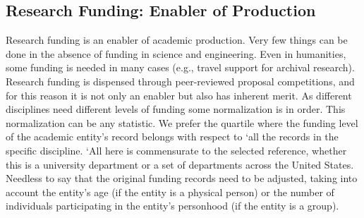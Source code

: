 \subsection {Research Funding: Enabler of Production}
Research funding is an enabler of academic production. Very few things can be done in the absence of funding in science and engineering. Even in humanities, some funding is needed in many cases (e.g., travel support for archival research).  Research funding is dispensed through peer-reviewed proposal competitions, and for this reason it is not only an enabler but also has inherent merit. As different disciplines need different levels of funding some normalization is in order. This normalization can be any statistic. We prefer the quartile where the funding level of the academic entity's record belongs with respect to `all the records in the specific discipline. `All here is commensurate to the selected reference, whether this is a university department or a set of departments across the United States.  Needless to say that the original funding records need to be adjusted, taking into account the entity's age (if the entity is a physical person) or the number of individuals participating in the entity's personhood (if the entity is a group).


